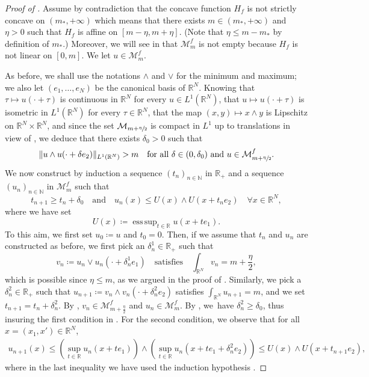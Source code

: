 \documentclass[10pt]{amsart}
\theoremstyle{plain}
\theoremstyle{definition}
\newcommand{\N}{\mathbb{N}}
\newcommand{\R}{\mathbb{R}}
\DeclarePairedDelimiter{\norm}{\lVert}{\rVert}
\DeclareMathOperator*{\esssup}{ess\,sup}
\begin{document}
\begin{proof}[Proof of ]
Assume by contradiction that the concave function \(H_f\) is not strictly concave on \((m_\ast,+\infty)\) which means that there exists \(m\in (m_\ast,+\infty)\) and \(\eta>0\) such that \(H_f\) is affine on \([m-\eta,m+\eta]\). (Note that \(\eta\leq m-m_\ast\) by definition of \(m_\ast\).) Moreover, we will see in  that \(\mathcal{M}^f_m\) is not empty because $H_f$ is not linear on $[0,m]$. We let \(u\in \mathcal{M}^f_m\).

As before, we shall use the notations \(\wedge\) and \(\vee\) for the minimum and maximum; we also let \((e_1,\dots,e_N)\) be the canonical basis of \(\R^N\). Knowing that \(\tau \mapsto u(\cdot+\tau)\) is continuous in $\R^N$ for every $u\in L^1(\R^N)$, that \(u\mapsto u(\cdot+\tau)\) is isometric in \(L^1(\R^N)\) for every \(\tau\in\R^N\), that the map \((x,y)\mapsto x\wedge y\) is Lipschitz on \(\R^N\times\R^N\), and since the set \(\mathcal{M}_{m+\sfrac{\eta}{2}}\) is compact in \(L^1\) up to translations in view of , we deduce that there exists \(\delta_0>0\) such that
\begin{equation}\label{UnifContTrans}
\norm{u\wedge u(\cdot+\delta e_2)}_{L^1(\R^N)}>m\quad\text{for all }\delta\in (0,\delta_0)\text{ and }u\in\mathcal{M}^f_{m+\sfrac{\eta}{2}}.
\end{equation}
We now construct by induction a sequence \((t_n)_{n\in\N}\) in \(\R_+\) and a sequence \((u_n)_{n\in\N}\) in \(\mathcal{M}^f_m\) such that
\begin{equation}\label{inductionHyp}
t_{n+1}\geq t_n+\delta_0\quad \text{and}\quad u_n(x)\leq U(x)\wedge U(x+ t_n e_2)\quad\forall x\in\R^N,
\end{equation}
where we have set
\[
U(x)\coloneqq \esssup_{t\in\R} u(x+t e_1).
\]
To this aim, we first set \(u_0\coloneqq u\) and \(t_0=0\). Then, if we assume that \(t_n\) and \(u_n\) are constructed as before, we first pick an \(\delta^1_n\in \R_+\) such that
\[
v_n\coloneqq u_n\vee u_n(\cdot+\delta^1_n e_1)\quad\text{satisfies}\quad\int_{\R^N} v_n=m+\frac{\eta}{2},
\]
which is possible since $\eta\leq m$, as we argued in the proof of . Similarly, we pick a \(\delta^2_n\in \R_+\) such that \(u_{n+1}\coloneqq v_n\wedge v_n(\cdot+\delta^2_n e_2)\) satisfies \(\int_{\R^N} u_{n+1}=m\), and we set \(t_{n+1}=t_n+\delta^2_n\). By , $v_n\in\mathcal{M}^f_{m+\frac{\eta}{2}}$ and $u_n\in\mathcal{M}^f_m$. By , we~have \(\delta^2_n\geq \delta_0\), thus insuring the first condition in . For the second condition, we observe that for all \(x=(x_1,x')\in\R^N\),
\begin{align*}
u_{n+1}(x)\leq(\sup_{t\in\R} u_n(x+t e_1))\wedge (\sup_{t\in\R}u_n(x+t e_1+\delta^2_n e_2))\leq U(x)\wedge U(x+t_{n+1}e_2),
\end{align*}
where in the last inequality we have used the induction hypothesis .


\end{proof}
\end{document}
